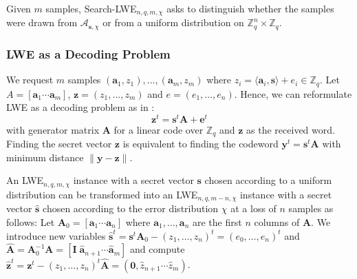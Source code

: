 \documentclass[
  a4paper,  %
  twoside,  %
  bibliography=totoc,
  headsepline,
  cleardoublepage=empty,
  parskip=half,
  draft=false
]{scrbook}
\begin{document}
\begin{definition}
  Given $m$ samples, Search-LWE$_{n, q, m, \chi}$ asks to distinguish whether the samples were drawn from  $\mathcal{A}_{\textbf{s}, \chi}$ or from a uniform distribution on $\mathbb{Z}_q^n \times \mathbb{Z}_q$.
\end{definition}

\subsubsection{LWE as a Decoding Problem}
We request $m$ samples $(\textbf{a}_1, z_1), \ldots, (\textbf{a}_m, z_m)$ where $z_i = \langle \textbf{a}_i, \textbf{s} \rangle + e_i \in \mathbb{Z}_q$. Let $A = \left[ \textbf{a}_1 \cdots \textbf{a}_m\right]$, $\textbf{z} = (z_1, \ldots, z_m)$ and $e = (e_1, \ldots, e_n)$. Hence, we can reformulate LWE as a decoding problem as in \cite{GJS15}:
\begin{equation} \label{eq:lwe-decoding}
  \textbf{z}^t = \textbf{s}^t \textbf{A} + \textbf{e}^t
\end{equation}
with generator matrix $\textbf{A}$ for a linear code over $\mathbb{Z}_q$ and $\textbf{z}$ as the received word. Finding the secret vector $\textbf{z}$ is equivalent to finding the codeword $\textbf{y}^t = \textbf{s}^t \textbf{A}$ with minimum distance $\| \textbf{y} - \textbf{z} \|$. 

An LWE$_{n, q, m, \chi}$ instance with a secret vector $\textbf{s}$ chosen according to a uniform distribution can be transformed into an LWE$_{n, q, m-n, \chi}$ instance with a secret vector $\hat{\textbf{s}}$ chosen according to the error distribution $\chi$ at a loss of $n$ samples as follows: Let $\textbf{A}_0 = \left[ \textbf{a}_1 \cdots \textbf{a}_n\right]$ where $\textbf{a}_1, \ldots, \textbf{a}_n$ are the first $n$ columns of $\textbf{A}$. We introduce new variables $\hat{\textbf{s}}^t = \textbf{s}^t \textbf{A}_0 - \left(z_1, \ldots, z_n\right)^t = \left(e_0, \ldots, e_n\right)^t$ and $\hat{\textbf{A}} = \textbf{A}_0^{-1} \textbf{A} = \left[\textbf{I} \; \hat{\textbf{a}}_{n+1} \cdots \hat{\textbf{a}}_{m}\right]$ and compute $\hat{\textbf{z}}^t = \textbf{z}^t -  \left(z_1, \ldots, z_n\right)^t \hat{\textbf{A}} = \left(\textbf{0}, \hat{z}_{n+1} \cdots \hat{z}_{m} \right)$. 
\end{document}
